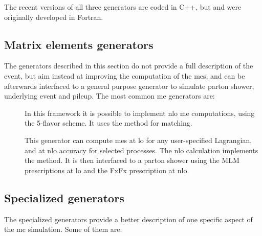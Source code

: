The recent versions of all three generators are coded in C++, but \HW and \PY were originally developed in Fortran.  

\subsection{Matrix elements generators}

The generators described in this section do not provide a full description of the event, but aim instead at improving the 
computation of the \glspl{me}, and can be afterwards interfaced to a general purpose generator to simulate parton shower, underlying event and pileup. The most common \gls{me} generators are:

\begin{description}
\item[\PowhegBox] \cite{Alioli:2010xd} In this framework it is possible to implement \gls{nlo} \gls{me} computations, using the 5-flavor scheme.
It uses the \Powheg method for matching. 

\item[\aNLO] \cite{Alwall:2014hca} This generator can compute \glspl{me} at \gls{lo} for any user-specified Lagrangian, and at \gls{nlo} accuracy for selected processes. %
The \gls{nlo} calculation implements the \mcatnlo method. 
It is then interfaced to a parton shower using the 
MLM prescriptions at \gls{lo} and the FxFx prescription at \gls{nlo}.

\end{description}

\subsection{Specialized generators}

The specialized generators provide a better description of one specific aspect of the \gls{mc} simulation. Some of them are:

